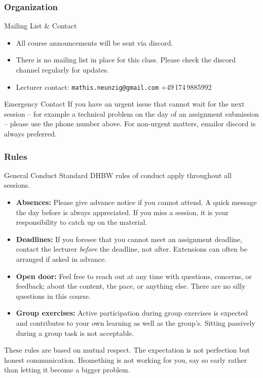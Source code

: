 \begin{frame}
  \frametitle{Organization}

  \begin{block}{Mailing List \& Contact}
    \begin{itemize}
      \item All course announcements will be sent via discord.
      \item There is no mailing list in place for this class. Please check the discord channel regularly for updates.
      \item Lecturer contact: \texttt{mathis.neunzig@gmail.com} \quad +49\,174\,9885992
    \end{itemize}
  \end{block}

  \begin{alertblock}{Emergency Contact}
    If you have an urgent issue that cannot wait for the next session -- for example a technical problem on the day of an assignment submission -- please use the phone number above. For non-urgent matters, emailor discord is always preferred.
  \end{alertblock}
\end{frame}

\begin{frame}
  \frametitle{Rules}

  \begin{block}{General Conduct}
    Standard DHBW rules of conduct apply throughout all sessions.
  \end{block}

  \begin{itemize}
    \item \textbf{Absences:} Please give advance notice if you cannot attend. A quick message the day before is always appreciated. If you miss a session, it is your responsibility to catch up on the material.
    \item \textbf{Deadlines:} If you foresee that you cannot meet an assignment deadline, contact the lecturer \emph{before} the deadline, not after. Extensions can often be arranged if asked in advance.
    \item \textbf{Open door:} Feel free to reach out at any time with questions, concerns, or feedback; about the content, the pace, or anything else. There are no silly questions in this course.
    \item \textbf{Group exercises:} Active participation during group exercises is expected and contributes to your own learning as well as the group's. Sitting passively during a group task is not acceptable.
  \end{itemize}

  These rules are based on mutual respect. The expectation is not perfection but honest communication. Ifsomething is not working for you, say so early rather than letting it become a bigger problem.
\end{frame}


